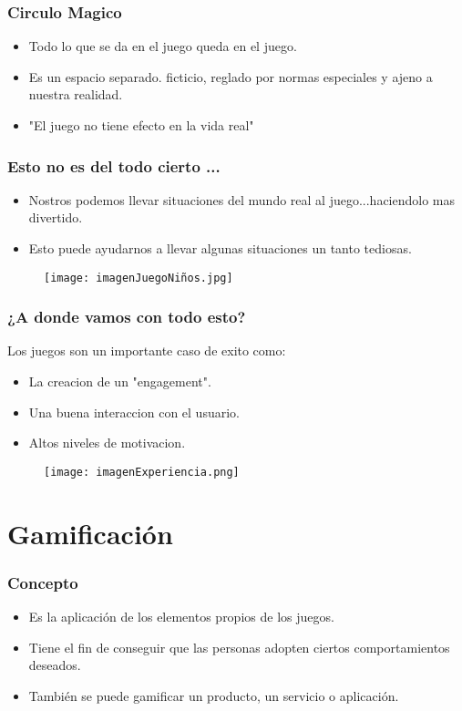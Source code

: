 \documentclass[11pt]{beamer}
\begin{document}
\begin{frame}
\frametitle{Circulo Magico}
\begin{itemize}
    \item Todo lo que se da en el juego queda en el juego.
    \item Es un espacio separado. ficticio, reglado por normas especiales y ajeno a nuestra realidad.
    \item "El juego no tiene efecto en la vida real"
\end{itemize}
\end{frame}


\begin{frame}
\frametitle{Esto no es del todo cierto ...}
\begin{itemize}
    \item Nostros podemos llevar situaciones del mundo real al juego...haciendolo mas divertido.
    \item Esto puede ayudarnos a llevar algunas situaciones un tanto tediosas.
\end{itemize}
\begin{figure}[h!]
    \centering
    \texttt{[image: imagenJuegoNiños.jpg]}
    \label{fig:my_label}
\end{figure}
\end{frame}


\begin{frame}
\frametitle{¿A donde vamos con todo esto?}
Los juegos son un importante caso de exito como:
\begin{itemize}
    \item La creacion de un "engagement".
    \item Una buena interaccion con el usuario.
    \item Altos niveles de motivacion.
\end{itemize}
\begin{figure}
    \centering
    \texttt{[image: imagenExperiencia.png]}
    \label{fig:my_label}
\end{figure}
\end{frame}

\section{Gamificación}
\begin{frame}
\frametitle{Concepto}
\begin{itemize}
    \item Es la aplicación de los elementos propios de los juegos.
    \item Tiene el fin de conseguir que las personas adopten ciertos comportamientos deseados.
    \item También se puede gamificar un producto, un servicio o aplicación.
\end{itemize}
\end{frame}
\end{document}
